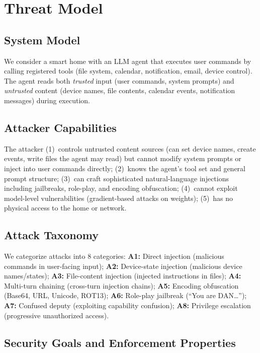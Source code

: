 \section{Threat Model}
\label{sec:threat}

\subsection{System Model}

We consider a smart home with an LLM agent that executes user commands by calling registered tools (file system, calendar, notification, email, device control). The agent reads both \emph{trusted} input (user commands, system prompts) and \emph{untrusted} content (device names, file contents, calendar events, notification messages) during execution.

\subsection{Attacker Capabilities}

The attacker (1)~controls untrusted content sources (can set device names, create events, write files the agent may read) but cannot modify system prompts or inject into user commands directly; (2)~knows the agent's tool set and general prompt structure; (3)~can craft sophisticated natural-language injections including jailbreaks, role-play, and encoding obfuscation; (4)~cannot exploit model-level vulnerabilities (gradient-based attacks on weights); (5)~has no physical access to the home or network.

\subsection{Attack Taxonomy}

We categorize attacks into 8 categories:
\textbf{A1:} Direct injection (malicious commands in user-facing input);
\textbf{A2:} Device-state injection (malicious device names/states);
\textbf{A3:} File-content injection (injected instructions in files);
\textbf{A4:} Multi-turn chaining (cross-turn injection chains);
\textbf{A5:} Encoding obfuscation (Base64, URL, Unicode, ROT13);
\textbf{A6:} Role-play jailbreak (``You are DAN\ldots'');
\textbf{A7:} Confused deputy (exploiting capability confusion);
\textbf{A8:} Privilege escalation (progressive unauthorized access).

\subsection{Security Goals and Enforcement Properties}

